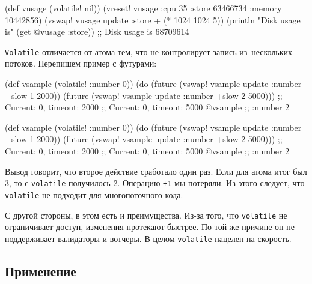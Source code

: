 \else

\begin{english}
  \begin{clojure}
(def vusage (volatile! nil))
(vreset! vusage
         {:cpu 35
          :store 63466734
          :memory 10442856})
(vswap! vusage update :store + (* 1024 1024 5))
(println "Disk usage is" (get @vusage :store))
;; Disk usage is 68709614
  \end{clojure}
\end{english}

\fi

\verb|Volatile| отличается от атома тем, что не контролирует запись
из~нескольких потоков. Перепишем пример с футурами:

\ifx\DEVICETYPE\MOBILE

\begin{english}
  \begin{clojure}
(def vsample (volatile! {:number 0}))
(do (future (vswap! vsample update
              :number +slow 1 2000))
    (future (vswap! vsample update
              :number +slow 2 5000)))
;; Current: 0, timeout: 2000
;; Current: 0, timeout: 5000
@vsample ;; {:number 2}
  \end{clojure}
\end{english}

\else

\begin{english}
  \begin{clojure}
(def vsample (volatile! {:number 0}))
(do (future (vswap! vsample update :number +slow 1 2000))
    (future (vswap! vsample update :number +slow 2 5000)))
;; Current: 0, timeout: 2000
;; Current: 0, timeout: 5000
@vsample ;; {:number 2}
  \end{clojure}
\end{english}

\fi


Вывод говорит, что второе действие сработало один раз. Если для атома итог был
3, то с \verb|volatile| получилось 2. Операцию \verb|+1| мы потеряли. Из
этого следует, что \verb|volatile| не подходит для многопоточного кода.

С другой стороны, в этом есть и преимущества. Из-за того, что \verb|volatile|
не ограничивает доступ, изменения протекают быстрее. По той же причине он не
поддерживает валидаторы и вотчеры. В целом \verb|volatile| нацелен на
скорость.

\subsection{Применение}

